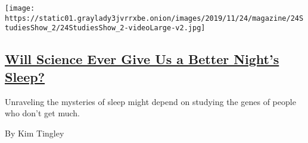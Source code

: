 \begin{enumerate}
  \texttt{[image: https://static01.graylady3jvrrxbe.onion/images/2019/11/24/magazine/24StudiesShow\_2/24StudiesShow\_2-videoLarge-v2.jpg]}

  \hypertarget{will-science-ever-give-us-a-better-nights-sleep}{%
  \subsection{\texorpdfstring{\href{/2019/11/19/magazine/will-science-ever-give-us-a-better-nights-sleep.html}{Will
  Science Ever Give Us a Better Night's
  Sleep?}}{Will Science Ever Give Us a Better Night's Sleep?}}\label{will-science-ever-give-us-a-better-nights-sleep}}

  Unraveling the mysteries of sleep might depend on studying the genes
  of people who don't get much.

  By Kim Tingley
\end{enumerate}


